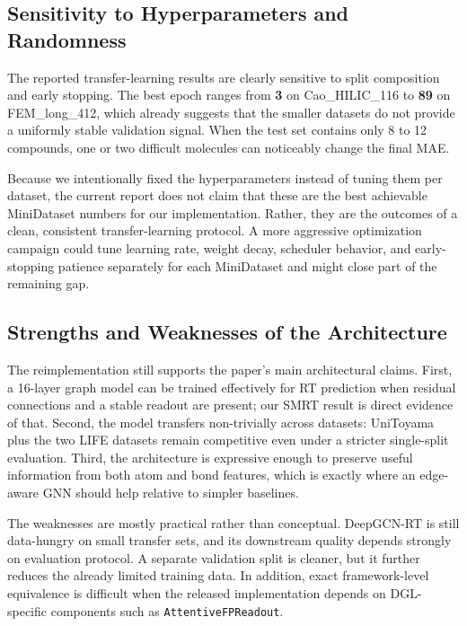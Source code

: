 \subsection{Sensitivity to Hyperparameters and Randomness}

The reported transfer-learning results are clearly sensitive to split composition and early stopping. The best epoch ranges from \textbf{3} on Cao\_HILIC\_116 to \textbf{89} on FEM\_long\_412, which already suggests that the smaller datasets do not provide a uniformly stable validation signal. When the test set contains only 8 to 12 compounds, one or two difficult molecules can noticeably change the final MAE.

Because we intentionally fixed the hyperparameters instead of tuning them per dataset, the current report does not claim that these are the best achievable MiniDataset numbers for our implementation. Rather, they are the outcomes of a clean, consistent transfer-learning protocol. A more aggressive optimization campaign could tune learning rate, weight decay, scheduler behavior, and early-stopping patience separately for each MiniDataset and might close part of the remaining gap.

\subsection{Strengths and Weaknesses of the Architecture}

The reimplementation still supports the paper's main architectural claims. First, a 16-layer graph model can be trained effectively for RT prediction when residual connections and a stable readout are present; our SMRT result is direct evidence of that. Second, the model transfers non-trivially across datasets: UniToyama plus the two LIFE datasets remain competitive even under a stricter single-split evaluation. Third, the architecture is expressive enough to preserve useful information from both atom and bond features, which is exactly where an edge-aware GNN should help relative to simpler baselines.

The weaknesses are mostly practical rather than conceptual. DeepGCN-RT is still data-hungry on small transfer sets, and its downstream quality depends strongly on evaluation protocol. A separate validation split is cleaner, but it further reduces the already limited training data. In addition, exact framework-level equivalence is difficult when the released implementation depends on DGL-specific components such as \texttt{AttentiveFPReadout}.

